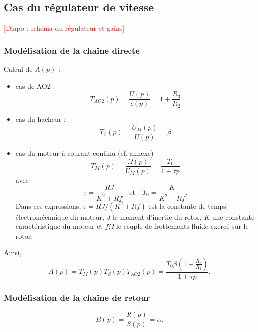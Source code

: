 \documentclass[11pt,a4paper]{report}
\begin{document}
\subsection{Cas du régulateur de vitesse}

\textcolor{red}{[Diapo : schéma du régulateur et gains]}

\subsubsection{Modélisation de la chaîne directe}

Calcul de $A(p)$ :
\begin{itemize}
	\item  cas de AO2 : 
	\begin{equation}
		T_{AO2}(p) = \frac{U(p)}{\epsilon(p)} = 1 + \frac{R_3}{R_2}
	\end{equation}
	\item cas du hacheur :
	\begin{equation}
		T_{\beta}(p) = \frac{U_M(p)}{U(p)} = \beta
	\end{equation}
	\item cas du moteur à courant continu (cf. annexe)
	\begin{equation}
		T_{M}(p) = \frac{\Omega(p)}{U_M(p)} = \frac{T_0}{1 + \tau p}
	\end{equation}
	avec
	\begin{equation}
		\tau = \frac{RJ}{K^2 + Rf} \quad \text{et}\quad T_0 = \frac{K}{K^2 + Rf}.
	\end{equation}
	Dans ces expressions, $\tau = RJ/(K^2 + Rf)$ est la constante de temps électromécanique du moteur, $J$ le moment d'inertie du rotor, $K$ une constante caractéristique du moteur et 
	$f\Omega$ le couple de frottements fluide exercé sur le rotor.\\
\end{itemize}

Ainsi, 
\begin{equation}
	A(p) = T_M(p) T_\beta(p) T_{AO2}(p) = \frac{T_0\beta\left(1+\frac{R_3}{R_2}\right)}{1+\tau p}.
\end{equation}

\subsubsection{Modélisation de la chaîne de retour}

\begin{equation}
	B(p) = \frac{R(p)}{S(p)} = \alpha.
\end{equation}
\end{document}
